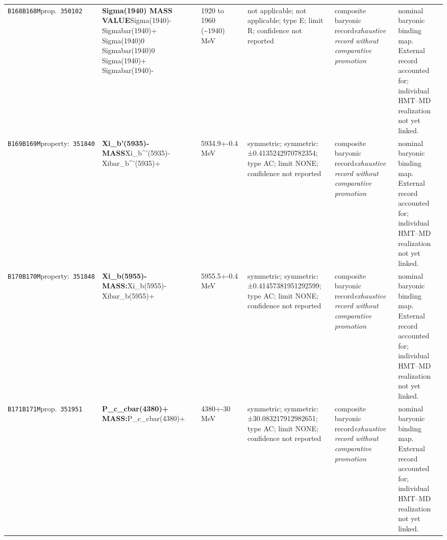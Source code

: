 \begin{landscape}
\begin{longtable}{L{1.85cm}L{4.45cm}L{2.35cm}L{4.05cm}L{3.35cm}L{7.15cm}}
\texttt{B168}\newline \texttt{B168M}\newline prop.\ \texttt{350102} & \textbf{Sigma(1940) MASS VALUE}\newline Sigma(1940)- \textbar{}\allowbreak{} Sigmabar(1940)+ \textbar{}\allowbreak{} Sigma(1940)0 \textbar{}\allowbreak{} Sigmabar(1940)0 \textbar{}\allowbreak{} Sigma(1940)+ \textbar{}\allowbreak{} Sigmabar(1940)- & 1920 to 1960 (\textasciitilde{}1940)\,MeV & not applicable; not applicable; type E; limit R; confidence not reported & composite baryonic record\newline \emph{exhaustive record without comparative promotion} & nominal baryonic binding map. External record accounted for; individual HMT--MD realization not yet linked. \\
\texttt{B169}\newline \texttt{B169M}\newline property:\ \texttt{351840} & \textbf{Xi\_\allowbreak{}b'(5935)- MASS}\newline Xi\_\allowbreak{}b\textasciicircum{}'(5935)- \textbar{}\allowbreak{} Xibar\_\allowbreak{}b\textasciicircum{}'(5935)+ & 5934.9+-0.4\,MeV & symmetric; symmetric: ±0.4135242970782354; type AC; limit NONE; confidence not reported & composite baryonic record\newline \emph{exhaustive record without comparative promotion} & nominal baryonic binding map. External record accounted for; individual HMT--MD realization not yet linked. \\
\texttt{B170}\newline \texttt{B170M}\newline property:\ \texttt{351848} & \textbf{Xi\_\allowbreak{}b(5955)- MASS:}\newline Xi\_\allowbreak{}b(5955)- \textbar{}\allowbreak{} Xibar\_\allowbreak{}b(5955)+ & 5955.5+-0.4\,MeV & symmetric; symmetric: ±0.41457381951292599; type AC; limit NONE; confidence not reported & composite baryonic record\newline \emph{exhaustive record without comparative promotion} & nominal baryonic binding map. External record accounted for; individual HMT--MD realization not yet linked. \\
\texttt{B171}\newline \texttt{B171M}\newline prop.\ \texttt{351951} & \textbf{P\_\allowbreak{}c\_\allowbreak{}cbar(4380)+ MASS:}\newline P\_\allowbreak{}c\_\allowbreak{}cbar(4380)+ & 4380+-30\,MeV & symmetric; symmetric: ±30.083217912982651; type AC; limit NONE; confidence not reported & composite baryonic record\newline \emph{exhaustive record without comparative promotion} & nominal baryonic binding map. External record accounted for; individual HMT--MD realization not yet linked. \\

\end{longtable}
\end{landscape}
